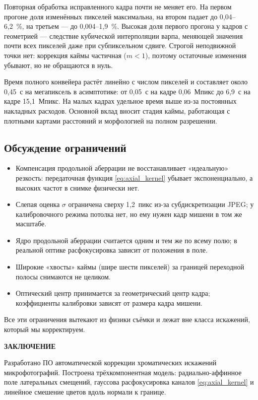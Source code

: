 \documentclass[a4paper,14pt,oneside]{extreport}
\newcommand{\structural}[1]{%
  \clearpage
  \addcontentsline{toc}{section}{#1}%
  {\centering\bfseries #1\par}%
  \vspace{\baselineskip}%
}
\begin{document}
Повторная обработка исправленного кадра почти не меняет его. На первом
прогоне доля изменённых пикселей максимальна, на втором падает до
0,04--6,2~\%, на третьем --- до 0,004--1,9~\%. Высокая доля первого прогона
у кадров с геометрией --- следствие кубической интерполяции варпа, меняющей
значения почти всех пикселей даже при субпиксельном сдвиге. Строгой
неподвижной точки нет: коррекция каймы частичная ($m<1$), поэтому остаточные
изменения убывают, но не обращаются в нуль.

Время полного конвейера растёт линейно с числом пикселей и составляет около
0,45~с на мегапиксель в асимптотике: от 0,05~с на кадре 0,06~Мпикс до
6,9~с на кадре 15,1~Мпикс. На малых кадрах удельное время выше из-за
постоянных накладных расходов. Основной вклад вносит стадия каймы, работающая
с плотными картами расстояний и морфологией на полном разрешении.

\subsection{Обсуждение ограничений}

\begin{itemize}
\item Компенсация продольной аберрации не восстанавливает «идеальную»
резкость: передаточная функция \eqref{eq:axial_kernel} убывает экспоненциально,
а высоких частот в снимке физически нет.
\item Слепая оценка $\sigma$ ограничена сверху 1{,}2~пикс из-за
субдискретизации JPEG; у калибровочного режима потолка нет, но ему нужен
кадр мишени в том же масштабе.
\item Ядро продольной аберрации считается одним и тем же по всему полю; в
реальной оптике расфокусировка зависит от положения в поле.
\item Широкие «хвосты» каймы (шире шести пикселей) за границей переходной
полосы снимаются не целиком.
\item Оптический центр принимается за геометрический центр кадра;
коэффициенты калибровки зависят от размера кадра мишени.
\end{itemize}

Все эти ограничения вытекают из физики съёмки и лежат вне класса искажений,
который мы корректируем.

\structural{ЗАКЛЮЧЕНИЕ}

Разработано ПО автоматической коррекции хроматических искажений
микрофотографий. Построена трёхкомпонентная модель: радиально-аффинное поле
латеральных смещений, гауссова расфокусировка каналов \eqref{eq:axial_kernel}
и линейное смешение цветов вдоль нормали к границе.
\end{document}
